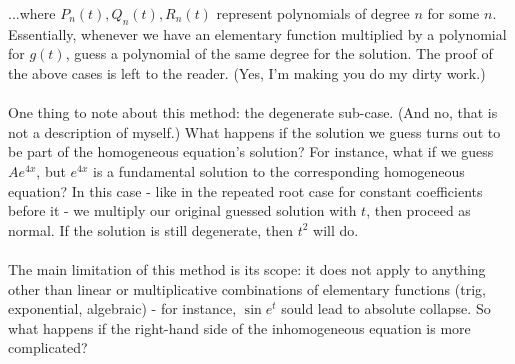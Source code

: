 \documentclass{article}
\begin{document}
...where $P_n(t), Q_n(t), R_n(t)$ represent polynomials of degree $n$ for some $n$. Essentially, whenever we have an elementary function multiplied by a polynomial for $g(t)$, guess a polynomial of the same degree for the solution. The proof of the above cases is left to the reader. (Yes, I'm making you do my dirty work.)\\ \\
One thing to note about this method: the degenerate sub-case. (And no, that is not a description of myself.) What happens if the solution we guess turns out to be part of the homogeneous equation's solution? For instance, what if we guess $Ae^{4x}$, but $e^{4x}$ is a fundamental solution to the corresponding homogeneous equation? In this case - like in the repeated root case for constant coefficients before it - we multiply our original guessed solution with $t$, then proceed as normal. If the solution is still degenerate, then $t^2$ will do.
\\ \\
The main limitation of this method is its scope: it does not apply to anything other than linear or multiplicative combinations of elementary functions (trig, exponential, algebraic) - for instance, $\sin e^t$ sould lead to absolute collapse. So what happens if the right-hand side of the inhomogeneous equation is more complicated?
\end{document}
